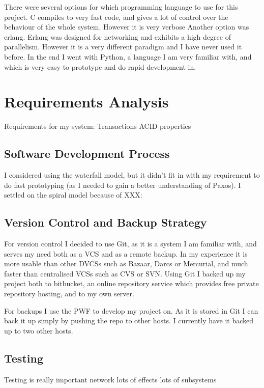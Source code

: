 \documentclass[12pt,twoside,notitlepage]{report}
\begin{document}
There were several options for which programming language to use for this project.  C compiles to
very fast code, and gives a lot of control over the behaviour of the whole system.  However it is
very verbose Another option was erlang. Erlang was designed for networking and exhibits a high
degree of parallelism. However it is a very different paradigm and I have never used it before.
In the end I went with Python, a language I am very familiar with, and which is very easy to
prototype and do rapid development in.

\section{Requirements Analysis}

Requirements for my system:
Transactions
ACID properties

\subsection{Software Development Process}

I considered using the waterfall model, but it didn't fit in with my requirement to do fast
prototyping (as I needed to gain a better understanding of Paxos). I settled on the spiral model
because of XXX:

\subsection{Version Control and Backup Strategy}

For version control I decided to use Git, as it is a system I am familiar with, and serves my need
both as a VCS and as a remote backup. In my experience it is more usable than other DVCSs such as
Bazaar, Darcs or Mercurial, and much faster than centralised VCSs such as CVS or SVN. Using Git I
backed up my project both to bitbucket, an online repository service which provides free private
repository hosting, and to my own server.

For backups I use the PWF to develop my project on. As it is stored in Git I can back it up simply
by pushing the repo to other hosts. I currently have it backed up to two other hosts.

\subsection{Testing}

Testing is really important
network
lots of effects
lots of subsystems
\end{document}
